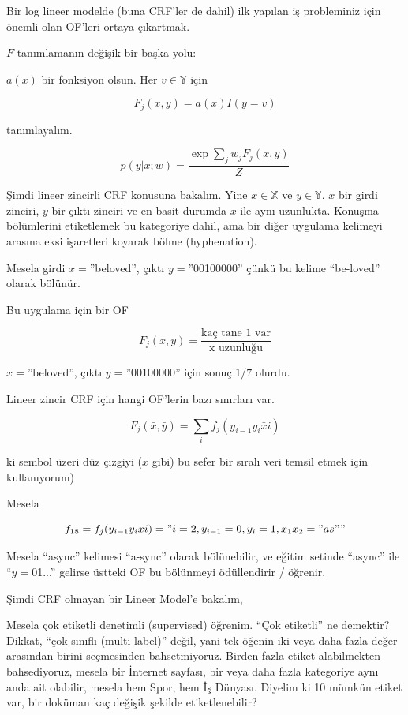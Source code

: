 \documentclass[12pt,fleqn]{article}\usepackage{../../common}
\begin{document}
Bir log lineer modelde (buna CRF'ler de dahil) ilk yapılan iş probleminiz
için önemli olan OF'leri ortaya çıkartmak.

$F$ tanımlamanın değişik bir başka yolu:

$a(x)$ bir fonksiyon olsun. Her $v \in \mathbb{Y}$ için

$$ F_j(x,y) = a(x) I(y=v)$$

tanımlayalım. 

$$ p(y|x;w) = \frac{\exp \sum_j w_j F_j (x,y)}{Z} $$

Şimdi lineer zincirli CRF konusuna bakalım. Yine $x \in \mathbb{X}$ ve $y
\in \mathbb{Y}$.  $x$ bir girdi zinciri, $y$ bir çıktı zinciri ve en basit
durumda $x$ ile aynı uzunlukta. Konuşma bölümlerini etiketlemek bu
kategoriye dahil, ama bir diğer uygulama kelimeyi arasına eksi işaretleri
koyarak bölme (hyphenation). 

Mesela girdi $x=$''beloved'', çıktı $y=$''00100000'' çünkü bu kelime
``be-loved'' olarak bölünür. 

Bu uygulama için bir OF 

$$ F_j(x,y) = \frac{\textrm{kaç  tane 1 var}}{\textrm{x uzunluğu}} $$

$x=$''beloved'', çıktı $y=$''00100000'' için sonuç $1/7$ olurdu.

Lineer zincir CRF için hangi OF'lerin bazı sınırları var. 

$$ F_j (\bar{x},\bar{y}) = \sum_i f_j(y_{i-1}y_i\bar{x} i) $$

ki sembol üzeri düz çizgiyi ($\bar{x}$ gibi) bu sefer bir sıralı veri
temsil etmek için kullanıyorum)

Mesela

$$ f_{18} =   f_j(y_{i-1}y_i\bar{x} i) = " i=2, y_{i-1} = 0, y_i = 1,
x_1x_2 = "as" "$$

Mesela ``async'' kelimesi ``a-sync'' olarak bölünebilir, ve eğitim setinde
``async'' ile ``$y=$01...'' gelirse üstteki OF bu bölünmeyi ödüllendirir /
öğrenir.

Şimdi CRF olmayan bir Lineer Model'e bakalım, 

Mesela çok etiketli denetimli (supervised) öğrenim. ``Çok etiketli'' ne
demektir?  Dikkat, ``çok sınıflı (multi label)'' değil, yani tek öğenin iki
veya daha fazla değer arasından birini seçmesinden bahsetmiyoruz. Birden
fazla etiket alabilmekten bahsediyoruz, mesela bir İnternet sayfası, bir
veya daha fazla kategoriye aynı anda ait olabilir, mesela hem Spor, hem İş
Dünyası. Diyelim ki 10 mümkün etiket var, bir doküman kaç değişik şekilde
etiketlenebilir?
\end{document}
